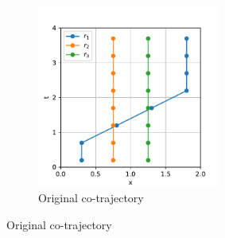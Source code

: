 \documentclass[12pt]{article}
\theoremstyle{definition}
\begin{document}
\begin{figure}
    \centering
    \begin{subfigure}[t]{0.45\textwidth}
      \includegraphics[width=6cm]{swap-order-counter-example-a.pdf}
      \caption{Original co-trajectory}
      \label{fig:swap-order-counter-example-a}
    \end{subfigure}


\end{figure}
\end{document}
